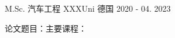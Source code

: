 

\begin{cventries}

  \cventry
    {M.Sc. 汽车工程} %
    {XXXUni} %
    {德国} %
    {2020 - 04. 2023} %
    {
      \begin{cvitems} %
        \item {论文题目：主要课程：}
      \end{cvitems}
    }

\end{cventries}
